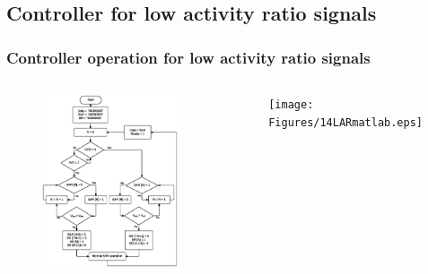 \documentclass{beamer}
\begin{document}
\subsection*{Controller for low activity ratio signals}
\begin{frame}
	\frametitle{Controller operation for low activity ratio signals } \footnotesize
	\begin{center}
		\begin{columns}[c]
		\column{2.5 in}
			\begin{center}
				\begin{figure}
					\includegraphics[width=5.5 cm,height=6 cm,angle=360]{Figures/11LARsig.ps}
				\end{figure}
				\scriptsize{ \color{blue}{Controller for low activity ratio signals }}
			\end{center}

		\column{2.5 in}
			\begin{center}
				\begin{figure}
					\texttt{[image: Figures/14LARmatlab.eps]}
				\end{figure}
				\scriptsize{ \color{blue}{Number of clock cycles needed for conversion}}
			\end{center}
		\end{columns}
	\end{center}
\end{frame}
\end{document}
